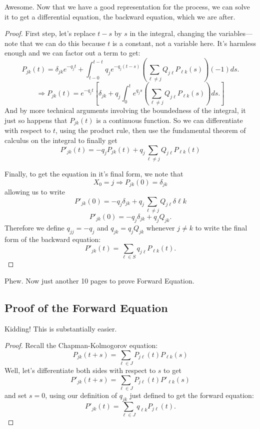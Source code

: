 \documentclass[a4paper,11pt]{scrartcl}
\begin{document}
Awesome. Now that we have a good representation for the process, we can 
solve it to get a differential equation, the backward equation, which 
we are after.

\begin{proof}

First step, let's replace $t-s$ by $s$ in the integral, changing the 
variables---note that we can do this because $t$ is a constant, not a 
variable here. It's harmless enough and we can factor out a term to get:
   \[ P_{jk}(t) = \delta_{jk} e^{-q_j t} + \int_{t-0}^{t-t}  
      q_j e^{-q_j (t-s)} \left( \sum_{\ell \neq j} Q_{j\ell}P_{\ell 
      k}(s) \right)(-1)ds. \]
   \[\Rightarrow  P_{jk}(t) = e^{-q_j t}\left[ \delta_{jk} + q_j  
      \int_0^t  e^{q_j s} \left( \sum_{\ell\neq j} Q_{j\ell}P_{\ell k}(s)
      \right) ds. \right] \]
And by more technical arguments involving the boundedness of the 
integral, it just so happens that $P_{jk}(t)$ is a continuous function.
So we can differentiate with respect to $t$, using the product rule, 
then use the fundamental 
theorem of calculus on the integral to finally get
   \[ P'_{jk}(t) = -q_j P_{jk}(t) +q_j\sum_{\ell \neq j} 
      Q_{j\ell}P_{\ell k}(t) \]

Finally, to get the equation in it's final form, we note that 
   \[ X_0 = j \Rightarrow   P_{jk}(0) = \delta_{jk}\]
allowing us to write
   \[ P'_{jk}(0) = -q_j\delta_{jk} + q_j \sum_{\ell\neq j} 
      Q_{j\ell}\delta{\ell k} \]
   \[ P'_{jk}(0) = -q_j\delta_{jk} + q_j Q_{jk}. \]
Therefore we define $q_{jj} = -q_j$ and $q_{jk} = q_j Q_{jk}$ whenever 
$j \neq k$ to write the final form of the backward equation:
   \[ P'_{jk}(t) = \sum_{\ell \in S} q_{j\ell}P_{\ell k}(t). \]
\end{proof}
Phew. Now just another 10 pages to prove Forward Equation.

\subsection{Proof of the Forward Equation}

Kidding! This is substantially easier.  

\begin{proof} 
Recall the Chapman-Kolmogorov equation:
     \[ P_{jk}(t+s) = \sum_{\ell\in J} P_{j\ell}(t) P_{\ell k}(s) \]
Well, let's differentiate both sides with respect to $s$ to get
     \[ P'_{jk}(t+s) = \sum_{\ell \in J}P_{j\ell}(t) P'_{\ell k}(s) \]
and set $s = 0$, using our definition of $q_{jk}$ just defined to get 
the forward equation:
     \[ P'_{jk}(t) = \sum_{\ell \in J} q_{\ell k} P_{j\ell}(t). \]
\end{proof}
\end{document}
